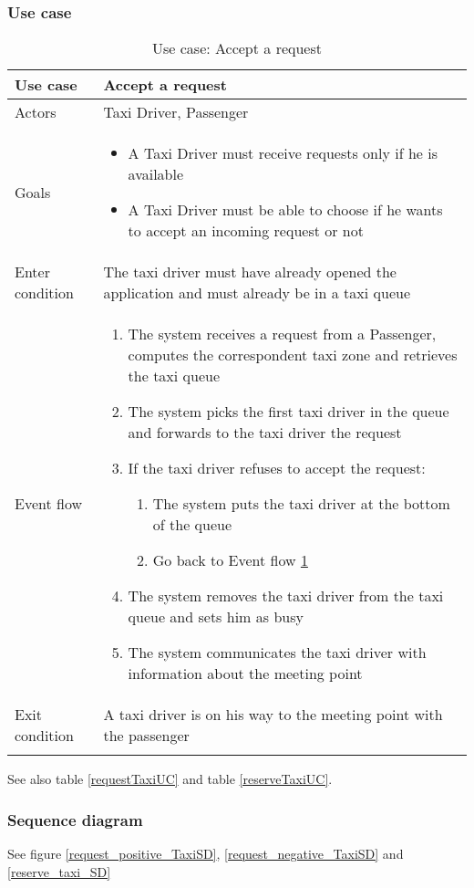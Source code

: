\subsubsection{Use case}
\begin{center}
\centering
\begin{longtable}{| p{} | p{} |} \hline
Use case & \textbf{Accept a request} \\ \hline 
Actors & Taxi Driver, Passenger \\ \hline
Goals & \begin{itemize}
			\item A Taxi Driver must receive requests only if he is available
			\item A Taxi Driver must be able to choose if he wants to accept an incoming request or not
		\end{itemize} \\ \hline
Enter condition & The taxi driver must have already opened the application and must already be in a taxi queue \\ \hline
Event flow & \begin{enumerate}
				\item The system receives a request from a Passenger, computes the correspondent taxi zone and retrieves the taxi queue
				\item The system picks the first taxi driver in the queue \label{firstTaxiDriver} and forwards to the taxi driver the request
				\item If the taxi driver refuses to accept the request:
				\begin{enumerate}
					\item The system puts the taxi driver at the bottom of the queue
					\item Go back to Event flow \ref{firstTaxiDriver}
				\end{enumerate}
				\item The system removes the taxi driver from the taxi queue and sets him as busy
				\item The system communicates the taxi driver with information about the meeting point
			\end{enumerate} \\ \hline
Exit condition & A taxi driver is on his way to the meeting point with the passenger  \\ \hline
\caption{Use case: Accept a request}
\end{longtable}
\end{center}
See also table \ref{requestTaxiUC} and table \ref{reserveTaxiUC}.

\subsubsection{Sequence diagram}
See figure \ref{request_positive_TaxiSD}, \ref{request_negative_TaxiSD} and \ref{reserve_taxi_SD}


